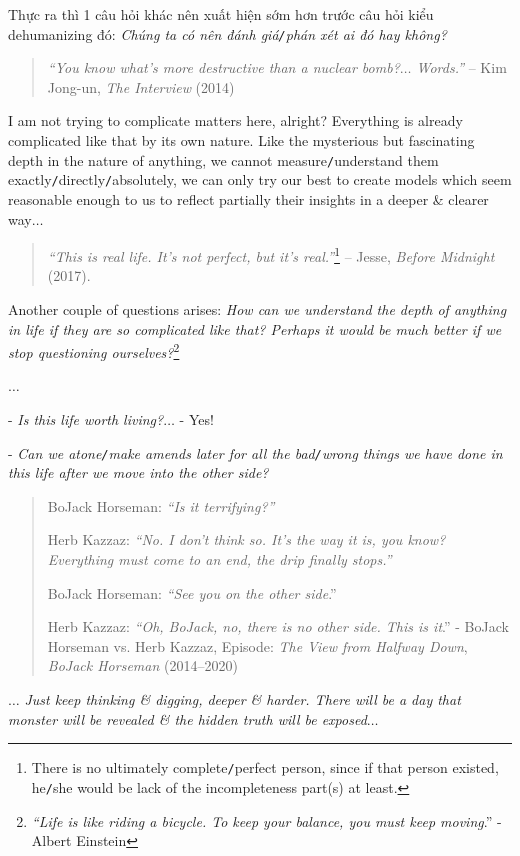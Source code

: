 \documentclass[12pt,oneside]{book}
\begin{document}
Thực ra thì 1 câu hỏi khác nên xuất hiện sớm hơn trước câu hỏi kiểu dehumanizing đó: {\it Chúng ta có nên đánh giá{\tt/}phán xét ai đó hay không?}
\begin{quotation}
	{\it``You know what's more destructive than a nuclear bomb?$\ldots$ Words.''} -- {\sf Kim Jong-un}, {\it The Interview} (2014)
\end{quotation}
I am not trying to complicate matters here, alright? Everything is already complicated like that by its own nature. Like the mysterious but fascinating depth in the nature of anything, we cannot measure{\tt/}understand them exactly{\tt/}directly{\tt/}absolutely, we can only try our best to create models which seem reasonable enough to us to reflect partially their insights in a deeper \& clearer way$\ldots$

\begin{quotation}
	{\it``This is real life. It's not perfect, but it's real.''}\footnote{There is no ultimately complete{\tt/}perfect person, since if that person existed, he{\tt/}she would be lack of the incompleteness part(s) at least.} -- {\sf Jesse}, {\it Before Midnight} (2017).
\end{quotation}
Another couple of questions arises: {\it How can we understand the depth of anything in life if they are so complicated like that? Perhaps it would be much better if we stop questioning ourselves?}\footnote{{\it``Life is like riding a bicycle. To keep your balance, you must keep moving}.'' - Albert Einstein}

$\ldots$

- {\it Is this life worth living?}$\ldots$ - Yes!

- {\it Can we atone{\tt/}make amends later for all the bad{\tt/}wrong things we have done in this life after we move into the other side?}
\begin{quote}    
	BoJack Horseman: {\it ``Is it terrifying?''}
	
	Herb Kazzaz: {\it ``No. I don't think so. It's the way it is, you know? Everything must come to an end, the drip finally stops.''}
	
	BoJack Horseman: {\it``See you on the other side}.''
	
	Herb Kazzaz: {\it``Oh, BoJack, no, there is no other side. This is it}.'' - BoJack Horseman vs. Herb Kazzaz,  Episode: {\it The View from Halfway Down}, {\it BoJack Horseman} (2014--2020)
\end{quote}
$\ldots$ {\it Just keep thinking \& digging, deeper \& harder. There will be a day that monster will be revealed \& the hidden truth will be exposed}$\ldots$
\end{document}
